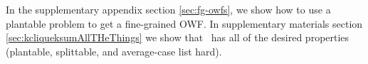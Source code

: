 In the supplementary appendix section \ref{sec:fg-owfs}, we show how to use a plantable problem to get a fine-grained OWF.
In supplementary materials section \ref{sec:kcliqueksumAllTHeThings} we show that \zkclique~has all of the desired properties (plantable, splittable, and average-case list hard).
